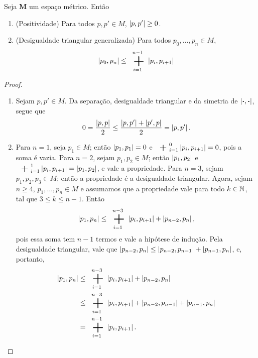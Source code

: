 \begin{proposition}
Seja $\bm M$ um espaço métrico. Então
	\begin{enumerate}
	\item (Positividade) Para todos $p,p' \in M$, $\left\vert{p},{p'}\right\vert \geq 0$.
	\item (Desigualdade triangular generalizada) Para todos $p_0,\ldots,p_n \in M$,
		\begin{equation*}
		\dist{p_0}{p_n} \leq \sum_{i=1}^{n-1} \dist{p_i}{p_{i+1}}
		\end{equation*}
	\end{enumerate}
\end{proposition}
\begin{proof}
	\begin{enumerate}
	\item Sejam $p,p' \in M$. Da separação, desigualdade triangular e da simetria de $\left\vert{\bm{\cdot}},{\bm{\cdot}}\right\vert$, segue que
	\begin{equation*}
	0 = \frac{\left\vert{p},{p}\right\vert}{2} \leq \frac{\left\vert{p},{p'}\right\vert + \left\vert{p'},{p}\right\vert}{2}= \left\vert{p},{p'}\right\vert.
	\end{equation*}

	\item Para $n=1$, seja $p_1 \in M$; então $\left\vert{p_1},{p_1}\right\vert=0$ e $\sum_{i=1}^{0} \dist{p_i}{p_{i+1}}=0$, pois a soma é vazia. Para $n=2$, sejam $p_1,p_2 \in M$; então $\left\vert{p_1},{p_2}\right\vert$ e $\sum_{i=1}^{1} \dist{p_i}{p_{i+1}}=\dist{p_1}{p_2}$, e vale a propriedade. Para $n=3$, sejam $p_1,p_2,p_3 \in M$; então a propriedade é a desigualdade triangular. Agora, sejam $n \geq 4$, $p_1,\ldots,p_n \in M$ e assumamos que a propriedade vale para todo $k \in \mathbb{N}$, tal que $3 \leq k \leq n-1$. Então
	\begin{equation*}
	\dist{p_1}{p_n} \leq \sum_{i=1}^{n-3} \dist{p_i}{p_{i+1}}+\dist{p_{n-2}}{p_n},
	\end{equation*}
	pois essa soma tem $n-1$ termos e vale a hipótese de indução. Pela desigualdade triangular, vale que $\left\vert{p_{n-2}},{p_n}\right\vert \leq \left\vert{p_{n-2}},{p_{n-1}}\right\vert+\left\vert{p_{n-1}},{p_n}\right\vert$, e, portanto,
	\begin{align*}
	\dist{p_1}{p_n} &\leq \sum_{i=1}^{n-3} \dist{p_i}{p_{i+1}}+\dist{p_{n-2}}{p_n} \\
			&\leq \sum_{i=1}^{n-3} \dist{p_i}{p_{i+1}} + \dist{p_{n-2}}{p_{n-1}}+\dist{p_{n-1}}{p_n} \\
			&= \sum_{i=1}^{n-1} \dist{p_i}{p_{i+1}}.
	\end{align*}
	\end{enumerate}
\end{proof}

